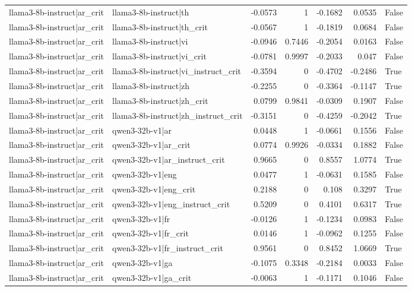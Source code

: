 \begin{table}
\begin{tabular}{l l r r r r l}
llama3-8b-instruct|ar_crit & llama3-8b-instruct|th & -0.0573 & 1 & -0.1682 & 0.0535 & False \\
llama3-8b-instruct|ar_crit & llama3-8b-instruct|th_crit & -0.0567 & 1 & -0.1819 & 0.0684 & False \\
llama3-8b-instruct|ar_crit & llama3-8b-instruct|vi & -0.0946 & 0.7446 & -0.2054 & 0.0163 & False \\
llama3-8b-instruct|ar_crit & llama3-8b-instruct|vi_crit & -0.0781 & 0.9997 & -0.2033 & 0.047 & False \\
llama3-8b-instruct|ar_crit & llama3-8b-instruct|vi_instruct_crit & -0.3594 & 0 & -0.4702 & -0.2486 & True \\
llama3-8b-instruct|ar_crit & llama3-8b-instruct|zh & -0.2255 & 0 & -0.3364 & -0.1147 & True \\
llama3-8b-instruct|ar_crit & llama3-8b-instruct|zh_crit & 0.0799 & 0.9841 & -0.0309 & 0.1907 & False \\
llama3-8b-instruct|ar_crit & llama3-8b-instruct|zh_instruct_crit & -0.3151 & 0 & -0.4259 & -0.2042 & True \\
llama3-8b-instruct|ar_crit & qwen3-32b-v1|ar & 0.0448 & 1 & -0.0661 & 0.1556 & False \\
llama3-8b-instruct|ar_crit & qwen3-32b-v1|ar_crit & 0.0774 & 0.9926 & -0.0334 & 0.1882 & False \\
llama3-8b-instruct|ar_crit & qwen3-32b-v1|ar_instruct_crit & 0.9665 & 0 & 0.8557 & 1.0774 & True \\
llama3-8b-instruct|ar_crit & qwen3-32b-v1|eng & 0.0477 & 1 & -0.0631 & 0.1585 & False \\
llama3-8b-instruct|ar_crit & qwen3-32b-v1|eng_crit & 0.2188 & 0 & 0.108 & 0.3297 & True \\
llama3-8b-instruct|ar_crit & qwen3-32b-v1|eng_instruct_crit & 0.5209 & 0 & 0.4101 & 0.6317 & True \\
llama3-8b-instruct|ar_crit & qwen3-32b-v1|fr & -0.0126 & 1 & -0.1234 & 0.0983 & False \\
llama3-8b-instruct|ar_crit & qwen3-32b-v1|fr_crit & 0.0146 & 1 & -0.0962 & 0.1255 & False \\
llama3-8b-instruct|ar_crit & qwen3-32b-v1|fr_instruct_crit & 0.9561 & 0 & 0.8452 & 1.0669 & True \\
llama3-8b-instruct|ar_crit & qwen3-32b-v1|ga & -0.1075 & 0.3348 & -0.2184 & 0.0033 & False \\
llama3-8b-instruct|ar_crit & qwen3-32b-v1|ga_crit & -0.0063 & 1 & -0.1171 & 0.1046 & False \\

\end{tabular}
\end{table}
